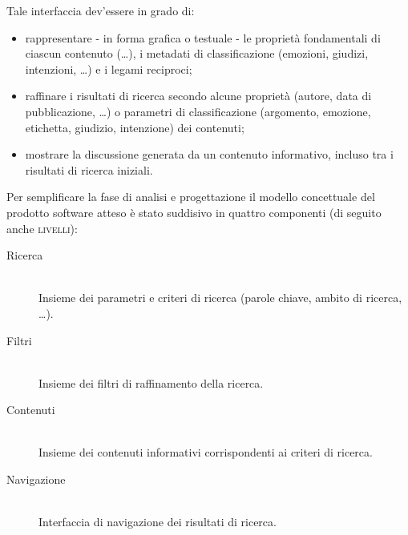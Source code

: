 Tale interfaccia dev'essere in grado di:
\begin{itemize}
	\item rappresentare - in forma grafica o testuale - le proprietà fondamentali di ciascun contenuto (\ldots), i metadati di classificazione (emozioni, giudizi, intenzioni, \ldots) e i legami reciproci;
	\item raffinare i risultati di ricerca secondo alcune proprietà (autore, data di pubblicazione, \ldots) o parametri di classificazione (argomento, emozione, etichetta, giudizio, intenzione) dei contenuti;
	\item mostrare la discussione generata da un contenuto informativo, incluso tra i risultati di ricerca iniziali.
\end{itemize}

Per semplificare la fase di analisi e progettazione il modello concettuale del prodotto software atteso è stato suddisivo in quattro componenti (di seguito anche \textsc{livelli}):
\begin{description}
 	\item[Ricerca] \hfill \\
 	Insieme dei parametri e criteri di ricerca (parole chiave, ambito di ricerca, \ldots).
 	\item[Filtri] \hfill \\
 	Insieme dei filtri di raffinamento della ricerca.
 	\item[Contenuti] \hfill \\
 	Insieme dei contenuti informativi corrispondenti ai criteri di ricerca.
 	\item[Navigazione] \hfill \\
 	Interfaccia di navigazione dei risultati di ricerca.
 \end{description}
 




